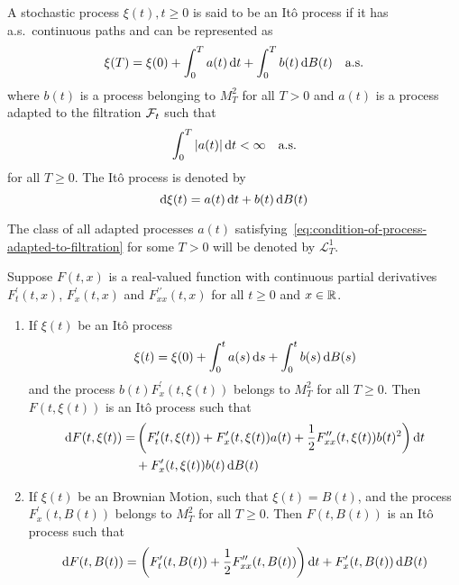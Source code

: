 \begin{definition}[It\^o Process]
	A stochastic process \(\xi(t),t\geq 0\) is said to be an It\^o process if it has a.s.\ continuous paths and can be represented as
	\begin{equation}
		\xi(T)=\xi(0)+\int_{0}^{T}a(t)\mathop{}\!\mathrm{d} t+\int_{0}^{T}b(t)\mathop{}\!\mathrm{d} B(t)\quad\text{a.s.}
	\end{equation}
	where \(b(t)\) is a process belonging to \(M_{T}^{2}\) for all \(T>0\) and \(a(t)\) is a process adapted to the filtration \(\mathcal{F}_{t}\) such that
	\begin{equation}
		\int_{0}^{T}|a(t)|\mathop{}\!\mathrm{d} t<\infty\quad\text {a.s.} \label{eq:condition-of-process-adapted-to-filtration}
	\end{equation}
	for all \(T\geq 0\).
	The It\^o process is denoted by
	\begin{equation}
		\mathop{}\!\mathrm{d}\xi(t)=a(t)\mathop{}\!\mathrm{d} t+b(t)\mathop{}\!\mathrm{d} B(t)
	\end{equation}
\end{definition}

\begin{remark}
	The class of all adapted processes \(a(t)\) satisfying~\ref{eq:condition-of-process-adapted-to-filtration} for some \(T>0\) will be denoted by \(\mathcal{L}_{T}^{1}\).
\end{remark}

\begin{theorem}[It\^o Formula]
	Suppose \(F\left(t,x\right)\) is a real-valued function with continuous partial derivatives \(F_{t}^{\prime}\left(t,x\right)\), \(F_{x}^{\prime}\left(t,x\right)\) and \(F_{xx}^{\prime\prime}\left(t,x\right)\) for all \(t\geq 0\) and \(x\in\mathbb{R}\).
	\begin{enumerate}
		\item If \(\xi(t)\) be an It\^o process
		      \begin{equation*}
			      \xi(t)=\xi(0)+\int_{0}^{t}a(s)\mathop{}\!\mathrm{d} s+\int_{0}^{t}b(s)\mathop{}\!\mathrm{d} B(s)
		      \end{equation*}
		      and the process \(b(t)F_{x}^{\prime}(t,\xi(t))\) belongs to \(M_{T}^{2}\) for all \(T\geq 0\). Then \(F(t,\xi(t))\) is an It\^o process such that
		      \begin{equation}
			      \begin{aligned}
				      \mathop{}\!\mathrm{d} F(t,\xi(t))= & \left(F_{t}^{\prime}(t,\xi(t))+F_{x}^{\prime}(t,\xi(t))a(t)+\frac{1}{2}F_{xx}^{\prime\prime}(t,\xi(t))b(t)^{2}\right)\mathop{}\!\mathrm{d} t \\
				                        & +F_{x}^{\prime}(t,\xi(t))b(t)\mathop{}\!\mathrm{d} B(t)
			      \end{aligned}
		      \end{equation}
		\item If \(\xi(t)\) be an Brownian Motion, such that \(\xi(t)=B(t)\), and the process \(F_{x}^{\prime}(t,B(t))\) belongs to \(M_{T}^{2}\) for all \(T \geq 0\). Then \(F(t,B(t))\) is an It\^o process such that
		      \begin{equation}
			      \mathop{}\!\mathrm{d} F(t,B(t))=\left(F_{t}^{\prime}(t,B(t))+\frac{1}{2}F_{xx}^{\prime\prime}(t,B(t))\right)\mathop{}\!\mathrm{d} t+F_{x}^{\prime}(t,B(t))\mathop{}\!\mathrm{d} B(t)
		      \end{equation}
	\end{enumerate}
\end{theorem}

